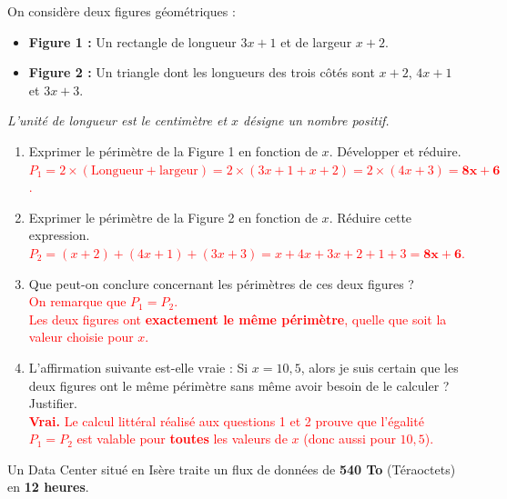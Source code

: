 \documentclass[a4paper]{book}
\begin{document}
{    \begin{exercice}
        On considère deux figures géométriques :
        \begin{itemize}
            \item \textbf{Figure 1 :} Un rectangle de longueur $3x + 1$ et de largeur $x + 2$.
            \item \textbf{Figure 2 :} Un triangle dont les longueurs des trois côtés sont $x + 2$, $4x + 1$ et $3x + 3$.
        \end{itemize}
        \textit{L'unité de longueur est le centimètre et $x$ désigne un nombre positif.}
        
        \begin{enumerate}
            \item Exprimer le périmètre de la Figure 1 en fonction de $x$. Développer et réduire. \\
            \textcolor{red}{$P_1 = 2 \times (\text{Longueur} + \text{largeur}) = 2 \times (3x + 1 + x + 2) = 2 \times (4x + 3) \mathbf{= 8x + 6}$.}
            
            \item Exprimer le périmètre de la Figure 2 en fonction de $x$. Réduire cette expression. \\
            \textcolor{red}{$P_2 = (x + 2) + (4x + 1) + (3x + 3) = x + 4x + 3x + 2 + 1 + 3 \mathbf{= 8x + 6}$.}
            
            \item Que peut-on conclure concernant les périmètres de ces deux figures ? \\
            \textcolor{red}{On remarque que $P_1 = P_2$. \\
            Les deux figures ont \textbf{exactement le même périmètre}, quelle que soit la valeur choisie pour $x$.}
            
            \item L'affirmation suivante est-elle vraie : \og Si $x = 10,5$, alors je suis certain que les deux figures ont le même périmètre sans même avoir besoin de le calculer \fg{} ? Justifier. \\
            \textcolor{red}{\textbf{Vrai.} Le calcul littéral réalisé aux questions 1 et 2 prouve que l'égalité $P_1 = P_2$ est valable pour \textbf{toutes} les valeurs de $x$ (donc aussi pour $10,5$).}
        \end{enumerate}
    \end{exercice}
    
    
    \begin{exercice} 
        Un Data Center situé en Isère traite un flux de données de \textbf{540 To} (Téraoctets) en \textbf{12 heures}.
        

\end{exercice}}
\end{document}
